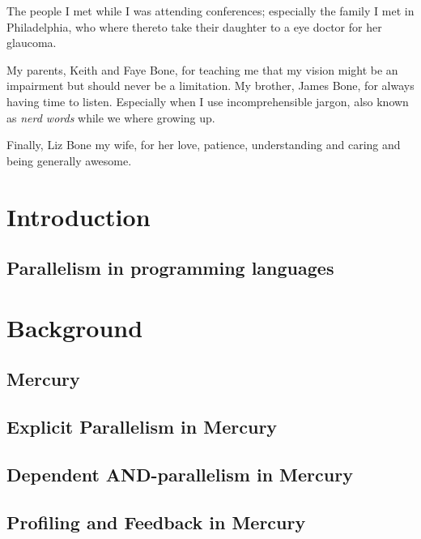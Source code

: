 \documentclass[a4paper,twoside]{report}
\begin{document}
The people I met while I was attending conferences;
especially the family I met in Philadelphia,
who where thereto take their daughter to a eye doctor for her glaucoma.

My parents, Keith and Faye Bone,
for teaching me that my vision might be an impairment but should never
be a limitation.
My brother, James Bone, for always having time to listen.
Especially when I use incomprehensible jargon,
also known as \emph{nerd words} while we where growing up.

Finally, Liz Bone my wife,
for her love, patience, understanding and caring
and being generally awesome.


\tableofcontents

\listoffigures

\listoftables

\listofalgorithms

\chapter{Introduction}
\label{chap:intro}


\section{Parallelism in programming languages}
\label{sec:literature_review}


\chapter{Background}

\section{Mercury}
\label{sec:back_mercury}


\section{Explicit Parallelism in Mercury}
\label{sec:back_mer_par}


\section{Dependent AND-parallelism in Mercury}
\label{sec:back_dep_par}


\section{Profiling and Feedback in Mercury}
\label{sec:back_deep}

\end{document}
